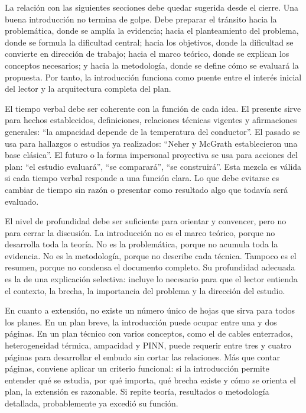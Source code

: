 \documentclass[11pt]{article}
\begin{document}
La relación con las siguientes secciones debe quedar sugerida desde el cierre. Una buena introducción no termina de golpe. Debe preparar el tránsito hacia la problemática, donde se amplía la evidencia; hacia el planteamiento del problema, donde se formula la dificultad central; hacia los objetivos, donde la dificultad se convierte en dirección de trabajo; hacia el marco teórico, donde se explican los conceptos necesarios; y hacia la metodología, donde se define cómo se evaluará la propuesta. Por tanto, la introducción funciona como puente entre el interés inicial del lector y la arquitectura completa del plan.

El tiempo verbal debe ser coherente con la función de cada idea. El presente sirve para hechos establecidos, definiciones, relaciones técnicas vigentes y afirmaciones generales: ``la ampacidad depende de la temperatura del conductor''. El pasado se usa para hallazgos o estudios ya realizados: ``Neher y McGrath establecieron una base clásica''. El futuro o la forma impersonal proyectiva se usa para acciones del plan: ``el estudio evaluará'', ``se comparará'', ``se construirá''. Esta mezcla es válida si cada tiempo verbal responde a una función clara. Lo que debe evitarse es cambiar de tiempo sin razón o presentar como resultado algo que todavía será evaluado.

El nivel de profundidad debe ser suficiente para orientar y convencer, pero no para cerrar la discusión. La introducción no es el marco teórico, porque no desarrolla toda la teoría. No es la problemática, porque no acumula toda la evidencia. No es la metodología, porque no describe cada técnica. Tampoco es el resumen, porque no condensa el documento completo. Su profundidad adecuada es la de una explicación selectiva: incluye lo necesario para que el lector entienda el contexto, la brecha, la importancia del problema y la dirección del estudio.

En cuanto a extensión, no existe un número único de hojas que sirva para todos los planes. En un plan breve, la introducción puede ocupar entre una y dos páginas. En un plan técnico con varios conceptos, como el de cables enterrados, heterogeneidad térmica, ampacidad y PINN, puede requerir entre tres y cuatro páginas para desarrollar el embudo sin cortar las relaciones. Más que contar páginas, conviene aplicar un criterio funcional: si la introducción permite entender qué se estudia, por qué importa, qué brecha existe y cómo se orienta el plan, la extensión es razonable. Si repite teoría, resultados o metodología detallada, probablemente ya excedió su función.
\end{document}
